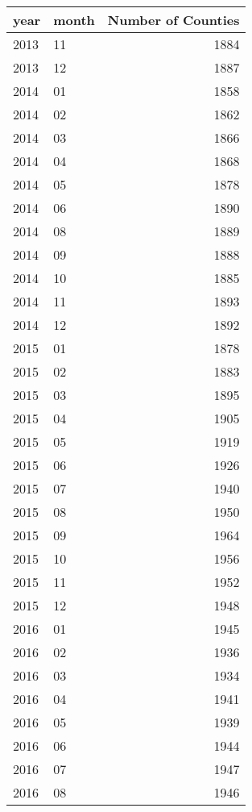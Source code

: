 \begin{tabular}{llr}
  \hline
year & month & Number of Counties \\ 
  \hline
2013 & 11 & 1884 \\ 
  2013 & 12 & 1887 \\ 
  2014 & 01 & 1858 \\ 
  2014 & 02 & 1862 \\ 
  2014 & 03 & 1866 \\ 
  2014 & 04 & 1868 \\ 
  2014 & 05 & 1878 \\ 
  2014 & 06 & 1890 \\ 
  2014 & 08 & 1889 \\ 
  2014 & 09 & 1888 \\ 
  2014 & 10 & 1885 \\ 
  2014 & 11 & 1893 \\ 
  2014 & 12 & 1892 \\ 
  2015 & 01 & 1878 \\ 
  2015 & 02 & 1883 \\ 
  2015 & 03 & 1895 \\ 
  2015 & 04 & 1905 \\ 
  2015 & 05 & 1919 \\ 
  2015 & 06 & 1926 \\ 
  2015 & 07 & 1940 \\ 
  2015 & 08 & 1950 \\ 
  2015 & 09 & 1964 \\ 
  2015 & 10 & 1956 \\ 
  2015 & 11 & 1952 \\ 
  2015 & 12 & 1948 \\ 
  2016 & 01 & 1945 \\ 
  2016 & 02 & 1936 \\ 
  2016 & 03 & 1934 \\ 
  2016 & 04 & 1941 \\ 
  2016 & 05 & 1939 \\ 
  2016 & 06 & 1944 \\ 
  2016 & 07 & 1947 \\ 
  2016 & 08 & 1946 \\ 
   \hline
\end{tabular}
